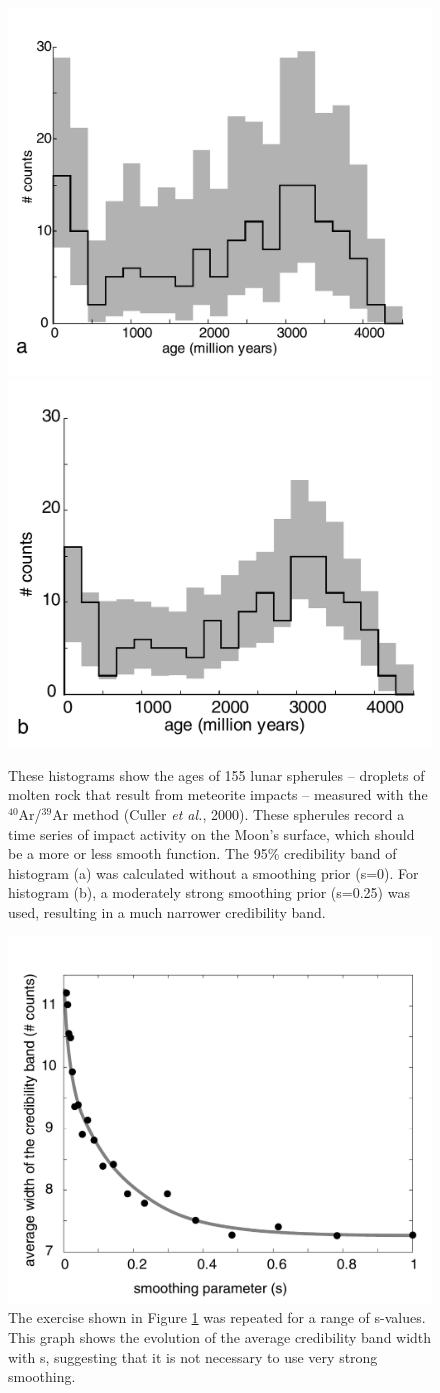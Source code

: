 \documentclass{article}
\begin{document}
\begin{figure}[here]
  \centering
  \includegraphics[width=.49\textwidth]{17b_s=0.pdf}
  \includegraphics[width=.49\textwidth]{17b_s=25.pdf}
  \caption{These histograms show the ages of 155 lunar spherules -- 
droplets of molten rock that result from meteorite impacts -- measured
with  the  $^{40}$Ar/$^{39}$Ar method  (Culler  {\it  et al.},  2000).
These spherules record a time  series of impact activity on the Moon's
surface, which  should be  a more or  less smooth function.   The 95\%
credibility band  of histogram (a) was calculated  without a smoothing
prior (s=0).  For histogram (b),  a moderately strong  smoothing prior
(s=0.25) was used, resulting in a much narrower credibility band.}
  \label{fig:culler}
\end{figure}

\begin{figure}[here]
  \centering
  \label{fig:CBwidthvsS}
  \includegraphics[width=.5\textwidth]{19.pdf}
  \caption{The exercise shown in Figure \ref{fig:culler} was repeated for
a range  of s-values.  This graph  shows the evolution  of the average
credibility band width with s,  suggesting that it is not necessary to
use very strong smoothing.}
\end{figure}
\end{document}
